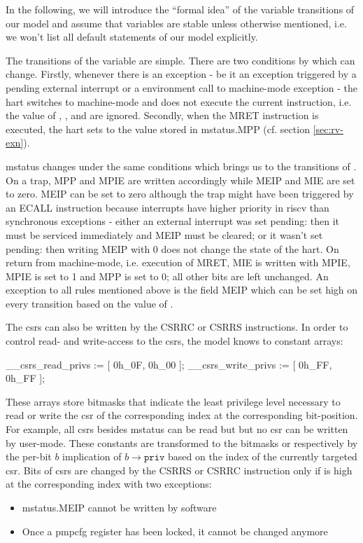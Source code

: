 In the following, we will introduce the \enquote{formal idea} of the variable transitions of our model and assume that variables are stable unless otherwise mentioned, i.e. we won't list all default statements of our model explicitly.

The transitions of the  variable are simple.
There are two conditions by which  can change.
Firstly, whenever there is an exception - be it an exception triggered by a pending external interrupt or a environment call to machine-mode exception - the \gls{hart} switches to machine-mode and does not execute the current instruction, i.e. the value of , ,  and  are ignored.
Secondly, when the MRET instruction is executed, the \gls{hart} sets  to the value stored in \gls{mstatus}.MPP (cf. section \ref{sec:rv-exn}).

\gls{mstatus} changes under the same conditions which brings us to the transitions of .
On a trap, MPP and MPIE are written accordingly while MEIP and MIE are set to zero.
MEIP can be set to zero although the trap might have been triggered by an ECALL instruction because interrupts have higher priority in \gls{riscv} than synchronous exceptions - either an external interrupt was set pending: then it must be serviced immediately and MEIP must be cleared; or it wasn't set pending: then writing MEIP with 0 does not change the state of the \gls{hart}.
On return from machine-mode, i.e. execution of MRET, MIE is written with MPIE, MPIE is set to 1 and MPP is set to 0; all other bits are left unchanged.
An exception to all rules mentioned above is the field MEIP which can be set high on every transition based on the value of .

The \glspl{csr} can also be written by the CSRRC or CSRRS instructions.
In order to control read- and write-access to the \glspl{csr}, the model knows to constant arrays:
\begin{smv}
__csrs_read_privs := [ 0h_0F, 0h_00 ];
__csrs_write_privs := [ 0h_FF, 0h_FF ];
\end{smv}

These arrays store bitmasks that indicate the least privilege level necessary to read or write the \gls{csr} of the corresponding index at the corresponding bit-position.
For example, all \glspl{csr} besides \gls{mstatus} can be read but but no \gls{csr} can be written by user-mode.
These constants are transformed to the bitmasks  or  respectively by the per-bit $ b $ implication of $ b \rightarrow \texttt{priv} $ based on the index of the currently targeted \gls{csr}.
Bits of \glspl{csr} are changed by the CSRRS or CSRRC instruction only if  is high at the corresponding index with two exceptions:
\begin{itemize}
    \item \gls{mstatus}.MEIP cannot be written by software
    \item Once a \gls{pmpcfg} register has been locked, it cannot be changed anymore
\end{itemize}

